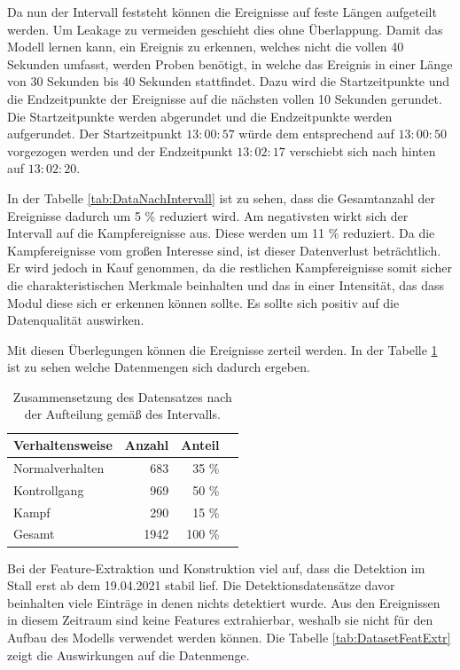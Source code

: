 Da nun der Intervall feststeht können die Ereignisse auf feste Längen aufgeteilt werden. Um \gls{Leakage} zu vermeiden geschieht dies ohne Überlappung. Damit das Modell lernen kann, ein Ereignis zu erkennen, welches nicht die vollen 40 Sekunden umfasst, werden Proben benötigt, in welche das Ereignis in einer Länge von 30 Sekunden bis 40 Sekunden stattfindet. Dazu wird die Startzeitpunkte und die Endzeitpunkte der Ereignisse auf die nächsten vollen 10 Sekunden gerundet. Die Startzeitpunkte werden abgerundet und die Endzeitpunkte werden aufgerundet. Der Startzeitpunkt \(13:00:57\) würde dem entsprechend auf \(13:00:50\) vorgezogen werden und der Endzeitpunkt \(13:02:17\) verschiebt sich nach hinten auf \(13:02:20\). \par

In der Tabelle \ref{tab:DataNachIntervall} ist zu sehen, dass die Gesamtanzahl der Ereignisse dadurch um 5 \% reduziert wird. Am negativsten wirkt sich der Intervall auf die Kampfereignisse aus. Diese werden um 11 \% reduziert. Da die Kampfereignisse vom großen Interesse sind, ist dieser Datenverlust beträchtlich. Er wird jedoch in Kauf genommen, da die restlichen Kampfereignisse somit sicher die charakteristischen Merkmale beinhalten und das in einer Intensität, das dass Modul diese sich er erkennen können sollte. Es sollte sich positiv auf die Datenqualität auswirken. \par

Mit diesen Überlegungen können die Ereignisse zerteil werden. In der Tabelle \ref{tab:DatasetSplit} ist zu sehen welche Datenmengen sich dadurch ergeben. 

\begin{table}[ht]
    \centering
    \caption{Zusammensetzung des Datensatzes nach der Aufteilung gemäß des Intervalls.}
    \begin{tabular}{|l|r|r|r|}
    \hline
        Verhaltensweise & Anzahl & Anteil \\
    \hline
        Normalverhalten & 683 & 35 \% \\
        Kontrollgang & 969 & 50 \% \\
        Kampf & 290 & 15 \% \\
    \hline
    \hline
        Gesamt & 1942 & 100 \%\\
    \hline
    \end{tabular}
    \label{tab:DatasetSplit}
\end{table}

Bei der Feature-Extraktion und Konstruktion viel auf, dass die Detektion im Stall erst ab dem 19.04.2021 stabil lief. Die Detektionsdatensätze davor beinhalten viele Einträge in denen nichts detektiert wurde. Aus den Ereignissen in diesem Zeitraum sind keine Features extrahierbar, weshalb sie nicht für den Aufbau des Modells verwendet werden können. Die Tabelle \ref{tab:DatasetFeatExtr} zeigt die Auswirkungen auf die Datenmenge.

